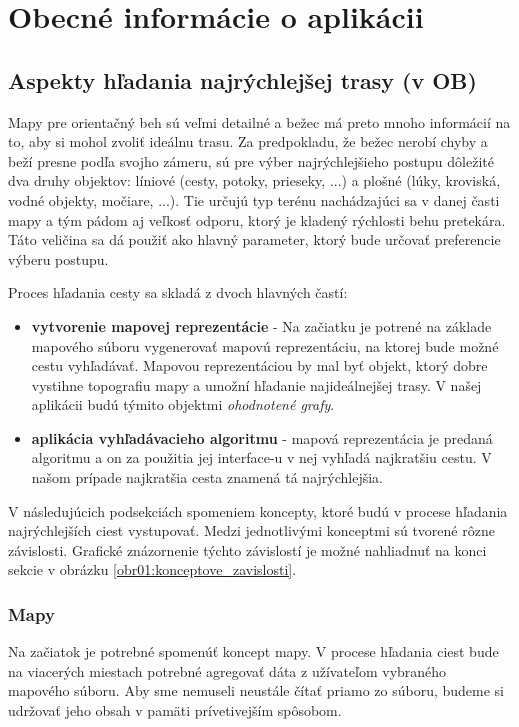 \chapter{Obecné informácie o aplikácii}

\section{Aspekty hľadania najrýchlejšej trasy (v OB)}\label{Aspekty_hladania}

Mapy pre orientačný beh sú veľmi detailné a bežec má preto mnoho informácií na to, aby si mohol zvoliť ideálnu trasu. Za predpokladu, že bežec nerobí chyby a beží presne podľa svojho zámeru, sú pre výber najrýchlejšieho postupu dôležité dva druhy objektov: líniové (cesty, potoky, prieseky, ...) a plošné (lúky, kroviská, vodné objekty, močiare, ...). Tie určujú typ terénu nachádzajúci sa v danej časti mapy a tým pádom aj veľkosť odporu, ktorý je kladený rýchlosti behu pretekára. Táto veličina sa dá použiť ako hlavný parameter, ktorý bude určovať preferencie výberu postupu.

Proces hľadania cesty sa skladá z dvoch hlavných častí: 
\begin{itemize}
    \item \textbf{vytvorenie mapovej reprezentácie} - Na začiatku je potrené na základe mapového súboru vygenerovať mapovú reprezentáciu, na ktorej bude možné cestu vyhľadávať. Mapovou reprezentáciou by mal byť objekt, ktorý dobre vystihne topografiu mapy a umožní hľadanie najideálnejšej trasy. V našej aplikácii budú týmito objektmi \textit{ohodnotené grafy}.  
    \item \textbf{aplikácia vyhľadávacieho algoritmu} - mapová reprezentácia je predaná algoritmu a on za použitia jej interface-u v nej vyhľadá najkratšiu cestu. V našom prípade najkratšia cesta znamená tá najrýchlejšia.
\end{itemize}

V následujúcich podsekciách spomeniem koncepty, ktoré budú v procese hľadania najrýchlejších ciest vystupovať. Medzi jednotlivými konceptmi sú tvorené rôzne závislosti. Grafické znázornenie týchto závislostí je možné nahliadnuť na konci sekcie v obrázku \ref{obr01:konceptove_zavislosti}.   

\subsection{Mapy}\label{mapy}

Na začiatok je potrebné spomenúť koncept mapy. V procese hľadania ciest bude na viacerých miestach potrebné agregovať dáta z užívateľom vybraného mapového súboru. Aby sme nemuseli neustále čítať priamo zo súboru, budeme si udržovať jeho obsah v pamäti prívetivejším spôsobom. 

